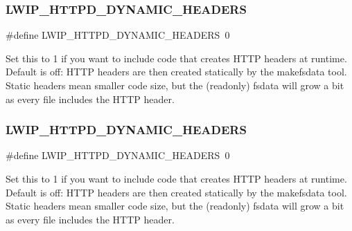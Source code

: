 \subsubsection{\texorpdfstring{L\+W\+I\+P\+\_\+\+H\+T\+T\+P\+D\+\_\+\+D\+Y\+N\+A\+M\+I\+C\+\_\+\+H\+E\+A\+D\+E\+RS}{LWIP\_HTTPD\_DYNAMIC\_HEADERS}\hspace{0.1cm}{\footnotesize\ttfamily [1/2]}}
{\footnotesize\ttfamily \#define L\+W\+I\+P\+\_\+\+H\+T\+T\+P\+D\+\_\+\+D\+Y\+N\+A\+M\+I\+C\+\_\+\+H\+E\+A\+D\+E\+RS~0}

Set this to 1 if you want to include code that creates H\+T\+TP headers at runtime. Default is off\+: H\+T\+TP headers are then created statically by the makefsdata tool. Static headers mean smaller code size, but the (readonly) fsdata will grow a bit as every file includes the H\+T\+TP header. \mbox{\label{group__httpd__opts_ga75932fc5eeb9abeddfdaf8413574c6d7}} 
\subsubsection{\texorpdfstring{L\+W\+I\+P\+\_\+\+H\+T\+T\+P\+D\+\_\+\+D\+Y\+N\+A\+M\+I\+C\+\_\+\+H\+E\+A\+D\+E\+RS}{LWIP\_HTTPD\_DYNAMIC\_HEADERS}\hspace{0.1cm}{\footnotesize\ttfamily [2/2]}}
{\footnotesize\ttfamily \#define L\+W\+I\+P\+\_\+\+H\+T\+T\+P\+D\+\_\+\+D\+Y\+N\+A\+M\+I\+C\+\_\+\+H\+E\+A\+D\+E\+RS~0}

Set this to 1 if you want to include code that creates H\+T\+TP headers at runtime. Default is off\+: H\+T\+TP headers are then created statically by the makefsdata tool. Static headers mean smaller code size, but the (readonly) fsdata will grow a bit as every file includes the H\+T\+TP header. \mbox{\label{group__httpd__opts_gaedd0fa3d356170d8ca3557acb410fd7c}} 
